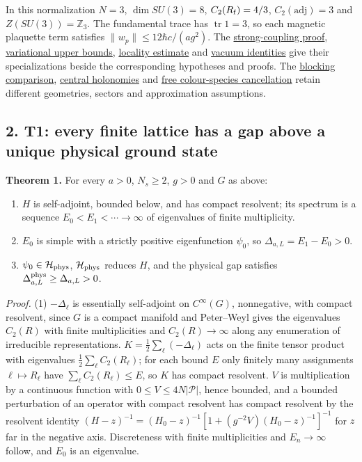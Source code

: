 \documentclass[11pt,a4paper]{article}
\newcommand{\tightlist}{\setlength{\itemsep}{0pt}\setlength{\parskip}{0pt}}
\begin{document}
In this normalization \(N=3\), \(\dim SU(3)=8\), \(C_2(R_{\rm f})=4/3\),
\(C_2(\mathrm{adj})=3\) and \(Z(SU(3))=\mathbb Z_3\). The fundamental
trace has \(\operatorname{tr}1=3\), so each magnetic plaquette term
satisfies \(\|w_p\|\le12\hbar c/(ag^2)\). The
\href{strong-coupling-uniform-gap.md}{strong-coupling proof},
\href{lattice-gap-upper-bounds.md}{variational upper bounds},
\href{lieb-robinson-kogut-susskind.md}{locality estimate} and
\href{ground-state-measure-transfer.md}{vacuum identities} give their
specializations beside the corresponding hypotheses and proofs. The
\href{blocking-criterion-monotone.md}{blocking comparison},
\href{torus-valley-potential.md\#4-saturation-and-central-holonomies}{central
holonomies} and
\href{finiteness-half-flowed-susceptibility.md\#the-bound-and-coupling-cancellation}{free
colour-species cancellation} retain different geometries, sectors and
approximation assumptions.

\subsection{2. T1: every finite lattice has a gap above a unique
physical ground
state}\label{t1-every-finite-lattice-has-a-gap-above-a-unique-physical-ground-state}

\textbf{Theorem 1.} For every \(a>0\), \(N_s\ge2\), \(g>0\) and \(G\) as
above:

\begin{enumerate}
\def\labelenumi{\arabic{enumi}.}
\tightlist
\item
  \(H\) is self-adjoint, bounded below, and has compact resolvent; its
  spectrum is a sequence \(E_0<E_1<\cdots\to\infty\) of eigenvalues of
  finite multiplicity.
\item
  \(E_0\) is simple with a strictly positive eigenfunction \(\psi_0\),
  so \(\Delta_{a,L}=E_1-E_0>0\).
\item
  \(\psi_0\in\mathcal H_{\rm phys}\), \(\mathcal H_{\rm phys}\) reduces
  \(H\), and the physical gap satisfies
  \(\Delta^{\rm phys}_{a,L}\ge\Delta_{a,L}>0\).
\end{enumerate}

\emph{Proof.} (1) \(-\Delta_\ell\) is essentially self-adjoint on
\(C^\infty(G)\), nonnegative, with compact resolvent, since \(G\) is a
compact manifold and Peter--Weyl gives the eigenvalues \(C_2(R)\) with
finite multiplicities and \(C_2(R)\to\infty\) along any enumeration of
irreducible representations. \(K=\tfrac12\sum_\ell(-\Delta_\ell)\) acts
on the finite tensor product with eigenvalues
\(\tfrac12\sum_\ell C_2(R_\ell)\); for each bound \(E\) only finitely
many assignments \(\ell\mapsto R_\ell\) have
\(\sum_\ell C_2(R_\ell)\le E\), so \(K\) has compact resolvent. \(V\) is
multiplication by a continuous function with
\(0\le V\le4N|\mathcal P|\), hence bounded, and a bounded perturbation
of an operator with compact resolvent has compact resolvent by the
resolvent identity
\((H-z)^{-1}=(H_0-z)^{-1}[1+(g^{-2}V)(H_0-z)^{-1}]^{-1}\) for \(z\) far
in the negative axis. Discreteness with finite multiplicities and
\(E_n\to\infty\) follow, and \(E_0\) is an eigenvalue.
\end{document}
